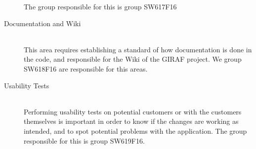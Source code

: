 \begin{description}
	The group responsible for this is group SW617F16
	\item[Documentation and Wiki] \hfill \\
	This area requires establishing a standard of how documentation is done in the code, and responsible for the Wiki of the GIRAF project. We group SW618F16 are responsible for this areas.
	\item[Usability Tests] \hfill \\
	Performing usability tests on potential customers or with the customers themselves is important in order to know if the changes are working as intended, and to spot potential problems with the application. The group responsible for this is group SW619F16.
\end{description}


